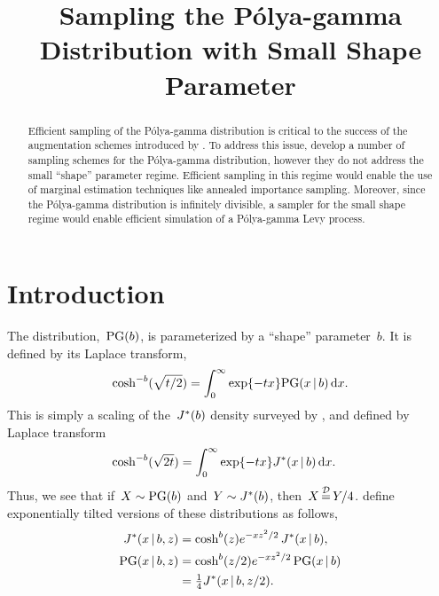 \documentclass[aos,preprint]{imsart}
\begin{document}
\begin{frontmatter}
\title{Sampling the P\'{o}lya-gamma Distribution with Small Shape Parameter}


\begin{aug}
\author{ }
\end{aug}

\begin{abstract}
  Efficient sampling of the P\'{o}lya-gamma
  distribution is critical to the success of
  the augmentation schemes introduced by \citet{polson2013bayesian}.
  To address this issue, \citet{windle2014sampling} develop a number
  of sampling schemes for
  the P\'{o}lya-gamma distribution, however they do not address the small
  ``shape'' parameter regime. Efficient sampling in this regime
  would enable the use of marginal estimation techniques like
  annealed importance sampling. Moreover, since the P\'{o}lya-gamma
  distribution is infinitely divisible, a sampler for the small
  shape regime would enable efficient simulation of a
  P\'{o}lya-gamma Levy process.
\end{abstract}
\end{frontmatter}

\section{Introduction}
The \polyagamma distribution,~$\mathrm{PG}(b)$, is parameterized
by a ``shape'' parameter~$b$. It is defined by its Laplace transform,
\begin{align}
  \cosh^{-b}(\sqrt{t/2}) = \int_0^\infty \exp\{-tx\} \distPolyaGamma(x \given b) \,\mathrm{d}x.
\end{align}
This is simply a scaling of the~$J^{*}(b)$ density surveyed by \citet{biane2001probability}, and defined by Laplace transform
\begin{align}
  \cosh^{-b}(\sqrt{2t}) &=  \int_{0}^\infty \exp\{-tx\} \distJacobi(x \given b) \, \mathrm{d}x. 
\end{align}
Thus, we see that if~$X \sim \mathrm{PG}(b)$ and~$Y \sim J^{*}(b)$, then~$X \disteq Y/4$. \citet{polson2013bayesian}
define exponentially tilted versions of these distributions as follows,
\begin{align}
  \distJacobi(x \given b, z) &= \cosh^b(z) e^{-xz^2/2} \, \distJacobi(x \given b), \\
  \distPolyaGamma(x \given b, z) &= \cosh^b(z/2) e^{-xz^2/2} \, \distPolyaGamma(x \given b) \\
  &= \tfrac{1}{4} \distJacobi(x \given b, z/2).
\end{align}
\end{document}
